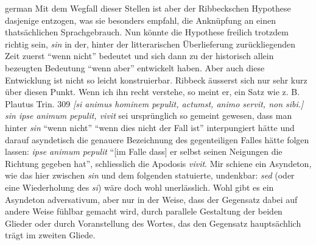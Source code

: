 \begin{otherlanguage*}{german}
Mit dem Wegfall dieser Stellen ist aber der Ribbeckschen Hypothese dasjenige entzogen, was sie besonders empfahl, die Anknüpfung an einen thatsächlichen Sprachgebrauch. Nun könnte die Hypothese freilich trotzdem richtig sein, \emph{sin} in der, hinter der litterarischen Überlieferung zurückliegenden Zeit zuerst “wenn nicht” bedeutet und sich dann zu der historisch allein bezeugten Bedeutung “wenn aber” entwickelt haben. Aber auch diese Entwicklung ist nicht so leicht konstruierbar. Ribbeck äusserst sich nur sehr kurz über diesen Punkt. Wenn ich ihn recht verstehe, so meint er, ein Satz wie z. B. Plautus Trin. 309 \emph{[si animus hominem pepulit, actumst, animo servit, non sibi.] sin ipse animum pepulit, vivit} sei ursprünglich so gemeint gewesen, dass man hinter \emph{sin} “wenn nicht” “wenn dies nicht der Fall ist” interpungiert hätte und darauf asyndetisch die genauere Bezeichnung des gegenteiligen Falles hätte folgen lassen: \emph{ipse animum pepulit} “[im Falle dass] er selbst seinen Neigungen die Richtung gegeben hat”, schliesslich die Apodosis \emph{vivit}. Mir schiene ein Asyndeton, wie das hier zwischen \emph{sin} und dem folgenden statuierte, undenkbar: \emph{sed} (oder eine Wiederholung des \emph{si}) wäre doch wohl unerlässlich. Wohl gibt es ein Asyndeton adversativum, aber nur in der Weise, dass der Gegensatz dabei auf andere Weise fühlbar gemacht wird, durch parallele Gestaltung der beiden Glieder oder durch Voranstellung des Wortes, das den Gegensatz hauptsächlich trägt im zweiten Gliede.


\end{otherlanguage*}

